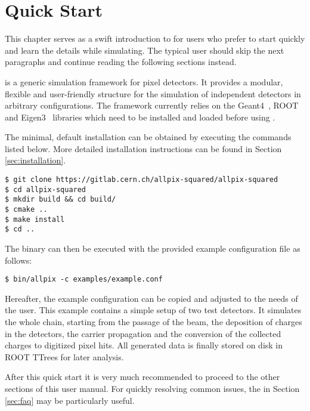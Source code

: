 \chapter{Quick Start}
This chapter serves as a swift introduction to \apsq for users who prefer to start quickly and learn the details while simulating.
The typical user should skip the next paragraphs and continue reading the following sections instead.

\apsq is a generic simulation framework for pixel detectors.
It provides a modular, flexible and user-friendly structure for the simulation of independent detectors in arbitrary configurations.
The framework currently relies on the Geant4~\cite{geant4}, ROOT~\cite{root} and Eigen3~\cite{eigen3} libraries which need to be installed and loaded before using \apsq.

The minimal, default installation can be obtained by executing the commands listed below.
More detailed installation instructions can be found in Section \ref{sec:installation}.

\begin{verbatim}
$ git clone https://gitlab.cern.ch/allpix-squared/allpix-squared
$ cd allpix-squared
$ mkdir build && cd build/
$ cmake ..
$ make install
$ cd ..
\end{verbatim}
The binary can then be executed with the provided example configuration file as follows:
\begin{verbatim}
$ bin/allpix -c examples/example.conf
\end{verbatim}

Hereafter, the example configuration can be copied and adjusted to the needs of the user.
This example contains a simple setup of two test detectors.
It simulates the whole chain, starting from the passage of the beam, the deposition of charges in the detectors, the carrier propagation and the conversion of the collected charges to digitized pixel hits.
All generated data is finally stored on disk in ROOT TTrees for later analysis.

After this quick start it is very much recommended to proceed to the other sections of this user manual.
For quickly resolving common issues, the  in Section \ref{sec:faq} may be particularly useful.
